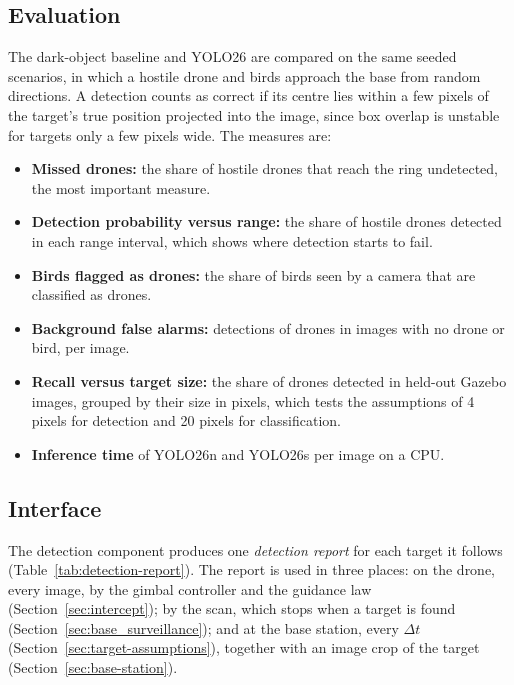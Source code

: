 \subsection{Evaluation}
The dark-object baseline and YOLO26 are compared on the same seeded
scenarios, in which a hostile drone and birds approach the base from random
directions. A detection counts as correct if its centre lies within a few
pixels of the target's true position projected into the image, since box
overlap is unstable for targets only a few pixels wide. The measures are:
\begin{itemize}
    \item \textbf{Missed drones:} the share of hostile drones that reach the
          ring undetected, the most important measure.
    \item \textbf{Detection probability versus range:} the share of hostile
          drones detected in each range interval, which shows where detection
          starts to fail.
    \item \textbf{Birds flagged as drones:} the share of birds seen by a
          camera that are classified as drones.
    \item \textbf{Background false alarms:} detections of drones in images
          with no drone or bird, per image.
    \item \textbf{Recall versus target size:} the share of drones detected in
          held-out Gazebo images, grouped by their size in pixels, which tests
          the assumptions of 4 pixels for detection and 20 pixels for
          classification.
    \item \textbf{Inference time} of YOLO26n and YOLO26s per image on a CPU.
\end{itemize}


\subsection{Interface}
\label{sec:detection-interface}
The detection component produces one \emph{detection report} for each
target it follows (Table~\ref{tab:detection-report}). The report is used
in three places: on the drone, every image, by the gimbal controller and
the guidance law (Section~\ref{sec:intercept}); by the scan, which stops
when a target is found (Section~\ref{sec:base_surveillance}); and at the
base station, every $\Delta t$ (Section~\ref{sec:target-assumptions}),
together with an image crop of the target (Section~\ref{sec:base-station}).


